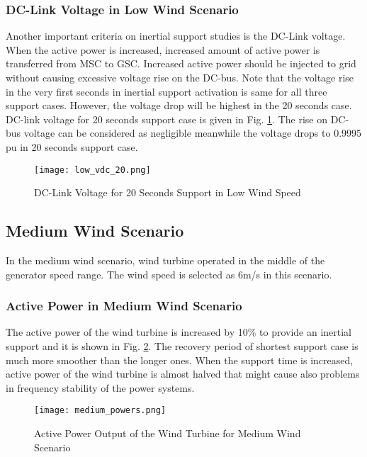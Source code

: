\subsubsection{DC-Link Voltage in Low Wind Scenario}
Another important criteria on inertial support studies is the DC-Link voltage. When the active power is increased, increased amount of active power is transferred from MSC to GSC. Increased active power should be injected to grid without causing excessive voltage rise on the DC-bus. Note that the voltage rise in the very first seconds in inertial support activation is same for all three support cases. However, the voltage drop will be highest in the 20 seconds case. DC-link voltage for 20 seconds support case is given in Fig. \ref{low_vdc_s20}. The rise on DC-bus voltage can be considered as negligible meanwhile the voltage drops to 0.9995 pu in 20 seconds support case.
\begin{figure}[h!]
	\centering
	\texttt{[image: low\_vdc\_20.png]}
	\caption{DC-Link Voltage for 20 Seconds Support in Low Wind Speed}
	\label{low_vdc_s20}
\end{figure}
\subsection{Medium Wind Scenario}
In the medium wind scenario, wind turbine operated in the middle of the generator speed range. The wind speed is selected as 6m/s in this scenario. 
\subsubsection{Active Power in Medium Wind Scenario}
The active power of the wind turbine is increased by 10\% to provide an inertial support and it is shown in Fig. \ref{midpowers}. The recovery period of shortest support case is much more smoother than the longer ones. When the support time is increased, active power of the wind turbine is almost halved that might cause also problems in frequency stability of the power systems.
\begin{figure}[h!]
	\centering
	\texttt{[image: medium\_powers.png]}
	\caption{Active Power Output of the Wind Turbine for Medium Wind Scenario}
	\label{midpowers}
\end{figure}
